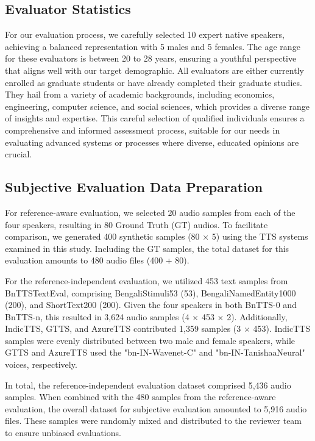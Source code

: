 \subsection{Evaluator Statistics}
For our evaluation process, we carefully selected 10 expert native speakers, achieving a balanced representation with 5 males and 5 females. The age range for these evaluators is between 20 to 28 years, ensuring a youthful perspective that aligns well with our target demographic. All evaluators are either currently enrolled as graduate students or have already completed their graduate studies. They hail from a variety of academic backgrounds, including economics, engineering, computer science, and social sciences, which provides a diverse range of insights and expertise. This careful selection of qualified individuals ensures a comprehensive and informed assessment process, suitable for our needs in evaluating advanced systems or processes where diverse, educated opinions are crucial.

\subsection{Subjective Evaluation Data Preparation} 
For reference-aware evaluation, we selected 20 audio samples from each of the four speakers, resulting in 80 Ground Truth (GT) audios. To facilitate comparison, we generated 400 synthetic samples (80 × 5) using the TTS systems examined in this study. Including the GT samples, the total dataset for this evaluation amounts to 480 audio files (400 + 80).

For the reference-independent evaluation, we utilized 453 text samples from BnTTSTextEval, comprising BengaliStimuli53 (53), BengaliNamedEntity1000 (200), and ShortText200 (200). Given the four speakers in both BnTTS-0 and BnTTS-n, this resulted in 3,624 audio samples (4 × 453 × 2). Additionally, IndicTTS, GTTS, and AzureTTS contributed 1,359 samples (3 × 453). IndicTTS samples were evenly distributed between two male and female speakers, while GTTS and AzureTTS used the "bn-IN-Wavenet-C" and "bn-IN-TanishaaNeural" voices, respectively.

In total, the reference-independent evaluation dataset comprised 5,436 audio samples. When combined with the 480 samples from the reference-aware evaluation, the overall dataset for subjective evaluation amounted to 5,916 audio files. These samples were randomly mixed and distributed to the reviewer team to ensure unbiased evaluations.

